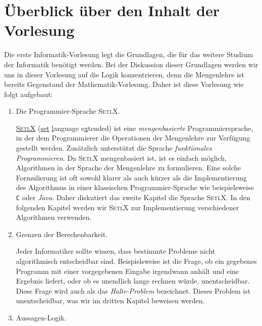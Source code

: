 \section{Überblick über den Inhalt der Vorlesung} 
Die erste Informatik-Vorlesung legt die Grundlagen, die für das weitere Studium
der Informatik benötigt werden.  Bei der Diskussion dieser Grundlagen werden wir uns in dieser
Vorlesung auf die Logik konzentrieren, denn die Mengenlehre ist bereits Gegenstand der
Mathematik-Vorlesung.  Daher ist diese Vorlesung wie folgt aufgebaut:
\begin{enumerate}
\item Die Programmier-Sprache \textsc{SetlX}.

      \href{http://randoom.org/Software/SetlX}{\textsc{SetlX}} (\underline{set} \underline{l}anguage
      e\underline{x}tended) ist eine \emph{mengenbasierte} 
      Programmiersprache, in der dem Programmierer die Operationen der Mengenlehre zur
      Verfügung gestellt werden.  Zusätzlich unterstützt die Sprache \emph{funktionales Programmieren}.
      Da \textsc{SetlX} mengenbasiert ist, ist es einfach möglich,  Algorithmen in der Sprache der
      Mengenlehre zu formulieren.  Eine solche Formulierung ist oft sowohl klarer als auch kürzer
      als die Implementierung des Algorithmus in einer klassischen Programmier-Sprache wie
      beispielsweise \texttt{C} oder \textsl{Java}.  Daher diskutiert das zweite Kapitel die Sprache
      \textsc{SetlX}.  In den folgenden Kapitel werden wir \textsc{SetlX} zur Implementierung
      verschiedener Algorithmen verwenden.
\item Grenzen der Berechenbarkeit.

      Jeder Informatiker sollte wissen, dass bestimmte Probleme nicht algorithmisch entscheidbar
      sind.  Beispielsweise ist die Frage, ob ein gegebenes Programm mit einer vorgegebenen Eingabe
      irgendwann anhält und eine Ergebnis liefert, oder ob es unendlich lange rechnen würde,
      unentscheidbar.  Diese Frage wird auch als das \emph{Halte-Problem} bezeichnet.
      Dieses Problem ist unentscheidbar, was wir im dritten Kapitel beweisen werden.
\item Aussagen-Logik.


\end{enumerate}
